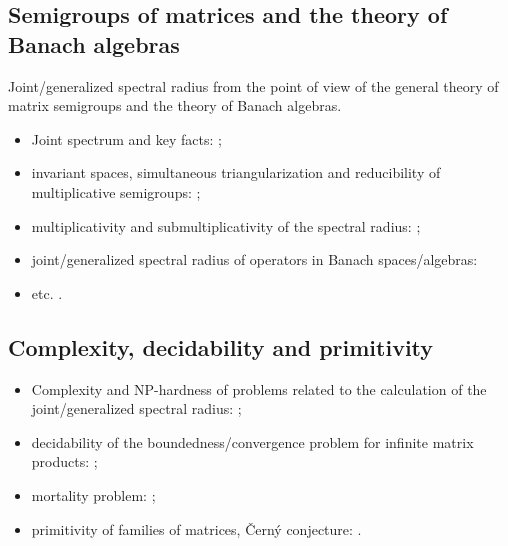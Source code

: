 \documentclass[a4paper,fleqn]{article}
\let\cite=\citep
\begin{document}
\subsection*{Semigroups of matrices and the theory of Banach algebras}
Joint/generalized spectral radius from the point of view of the general
theory of matrix semigroups and the theory of Banach algebras.

\begin{itemize}
  \item Joint spectrum and key facts: \cite{Bell:LAA05, BerWang:LAA92,
          BreSert:LMS21, EE:PAMS04, GurRod:SIAMJMAA97, Lur:LAA06-2, RS:PAMS95,
          Sert:Thesis16, Sert:CRMASP17};
  \item invariant spaces, simultaneous triangularization and reducibility of
        multiplicative semigroups: \cite{Drnov:97, Drnovsek:SM97, Drn:IEOT01,
          GPRSTT:P10, Guinand:PAMS82, HNRRR:HJM91, LMMR:JOT98, OmRadj:LAA97,
          Prot:FPM96:e, Radj:IUMJ90, RRS:PAMS00, Szep:AMH86};
  \item multiplicativity and submultiplicativity of the spectral radius:
        \cite{LR:CJM95, OmRadj:LAA97, ProtVoy:LAA17};
  \item joint/generalized spectral radius of operators in Banach
        spaces/algebras: \cite{BD:StochDyn21, BF:AIF21, Bogdanovic:ArXiv23,
          BP:LMA23, BP:ArXiv24v2, EE:PAMS04, LS:LAA02, KisShulTur:20,
          Morris:JFA12, Muller:APM97, Pep:LMA11, Peperko:LAA12, RS:PAMS95,
          ShulTur:ArXiv12, ShulTur:JFA00, ShulTur:SM02, Turovskii:JFA99,
          TurShul:FAP00, TurShul:FAP12}
  \item etc. \cite{Javaheri:JMAA13, Prot:ArXiv25, ManSim:TCS78}.
\end{itemize}

\subsection*{Complexity, decidability and primitivity}
\begin{itemize}
  \item Complexity and NP-hardness of problems related to the calculation of
        the joint/generalized spectral radius: \cite{AhmJun14, AhmJng:NAHS16,
          AltPar:CDC19, AltPar:SIAMJCO20, BGT:IEEETAC00, BJ:CANT10,
          BJP:IEEETIT06, BN:SIAMJMAA09, BT:Autom00, ChangPhD12, CB:NA13,
          CHJ:SIAMJCO15, HMS:MPCPS13, Jungers:09, PJ:CDC13, Theys:PhD05,
          TB:MCSS97-4, TB:MCSS97-1, Toker:AJIFAC97};
  \item decidability of the boundedness/convergence problem for infinite matrix
        products: \cite{AKKK:92:e, BBKPT:TCS01, BC:TCS03, BT:SCL00,
          CiconePhD11, Cicone:ArXiv15, JPB:LAA08, Koz:AiT90:6:e, Koz:AiT03:9:e,
          Koz:ArXiv13, VlasJung:SCL14};
  \item mortality problem: \cite{BBKPT:TCS01, BT:IPL97, BB:TCS02,
          Saouter:inria96};
  \item primitivity of families of matrices, \v{C}ern\'{y} conjecture:
        \cite{BJO:AJIFAC15, CosJun:LNCS18, CosJun:IJFCS20, ProtVoyn:LAA12,
          Jungers:LAA12}.
\end{itemize}
\end{document}
